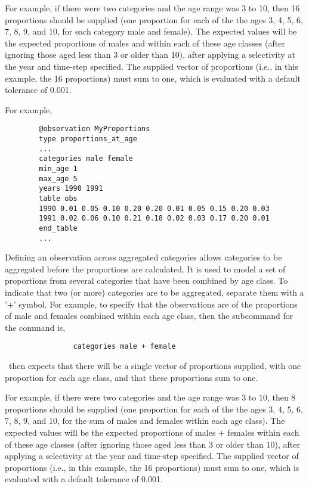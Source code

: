 For example, if there were two categories and the age range was 3 to 10, then 16 proportions should be supplied (one proportion for each of the the ages 3, 4, 5, 6, 7, 8, 9, and 10, for each category male and female). The expected values will be the expected proportions of males and within each of these age classes (after ignoring those aged less than 3 or older than 10), after applying a selectivity at the year and time-step specified. The supplied vector of proportions (i.e., in this example, the 16 proportions) must sum to one, which is evaluated with a default tolerance of 0.001. 

For example,

{\small{\begin{verbatim}
		@observation MyProportions
		type proportions_at_age
		...
		categories male female
		min_age 1
		max_age 5
		years 1990 1991
		table obs
		1990 0.01 0.05 0.10 0.20 0.20 0.01 0.05 0.15 0.20 0.03
		1991 0.02 0.06 0.10 0.21 0.18 0.02 0.03 0.17 0.20 0.01
		end_table
		...
		\end{verbatim}
		
		
Defining an observation across aggregated categories allows categories to be aggregated before the proportions are calculated. It is used to model a set of proportions from several categories that have been combined by age class. To indicate that two (or more) categories are to be aggregated, separate them with a '+' symbol. For example, to specify that the observations are of the proportions of male and females combined within each age class, then the subcommand  for the  command is,
		
		{\small{\begin{verbatim}
				categories male + female
				\end{verbatim}}}
		
\CNAME\ then expects that there will be a single vector of proportions supplied, with one proportion for each age class, and that these proportions sum to one. 
		
For example, if there were two categories and the age range was 3 to 10, then 8 proportions should be supplied (one proportion for each of the the ages 3, 4, 5, 6, 7, 8, 9, and 10, for the sum of males and females within each age class). The expected values will be the expected proportions of males + females within each of these age classes (after ignoring those aged less than 3 or older than 10), after applying a selectivity at the year and time-step specified. The supplied vector of proportions (i.e., in this example, the 16 proportions) must sum to one, which is evaluated with a default tolerance of 0.001. 
		
}}
